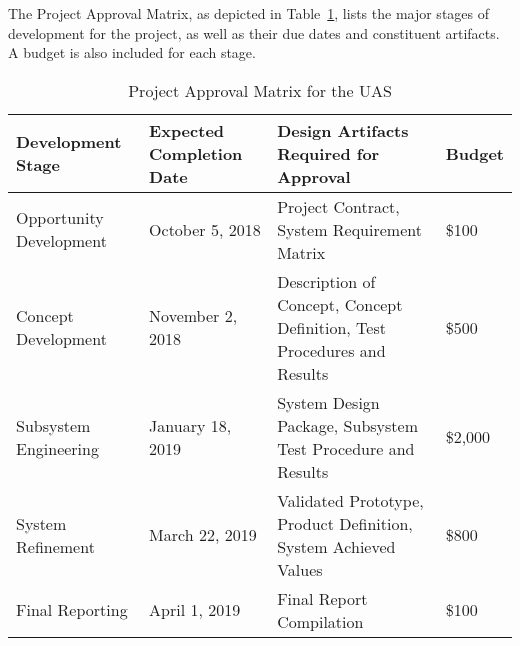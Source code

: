 

The Project Approval Matrix, as depicted in Table~\ref{tab:proj_app}, lists the major stages of development for the project, as well as their due dates and constituent artifacts. A budget is also included for each stage. 

\begin{table}[h!]
\caption{Project Approval Matrix for the UAS}\label{tab:proj_app}
\begin{tabular}{|p{4cm}|p{3.5cm}|p{5.4cm}|p{1.5cm}|}
 \hline	
\rowcolor[HTML]{C0C0C0}	
{\color[HTML]{000000} \textbf{Development Stage}} & {\color[HTML]{000000} \textbf{Expected Completion Date}} & {\color[HTML]{000000} \textbf{Design Artifacts Required for Approval}} & {\color[HTML]{000000} \textbf{Budget}}\\ \hline	
Opportunity Development & October 5, 2018 & Project Contract, System Requirement Matrix & \$100 \\ \hline	
Concept Development & November 2, 2018 & Description of Concept, Concept Definition, Test Procedures and Results & \$500 \\ \hline	
Subsystem Engineering & January 18, 2019 & System Design Package, Subsystem Test Procedure and Results & \$2,000\\ \hline	
System Refinement & March 22, 2019 & Validated Prototype, Product Definition, System Achieved Values & \$800\\ \hline	
Final Reporting & April 1, 2019 & Final Report Compilation & \$100 \\ \hline	

  \hline  
\end{tabular}

\end{table}
